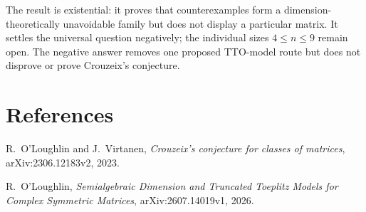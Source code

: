 \documentclass[10pt]{article}
\begin{document}
The result is existential: it proves that counterexamples form a
dimension-theoretically unavoidable family but does not display a particular
matrix.  It settles the universal question negatively; the individual sizes
$4\le n\le9$ remain open.  The negative answer removes one proposed TTO-model
route but does not disprove or prove Crouzeix's conjecture.

\section*{References}
\small\raggedright
\noindent[1] R.~O'Loughlin and J.~Virtanen,
\emph{Crouzeix's conjecture for classes of matrices},
arXiv:2306.12183v2, 2023.\par\smallskip
\noindent[2] R.~O'Loughlin,
\emph{Semialgebraic Dimension and Truncated Toeplitz Models for Complex
Symmetric Matrices}, arXiv:2607.14019v1, 2026.
\end{document}
